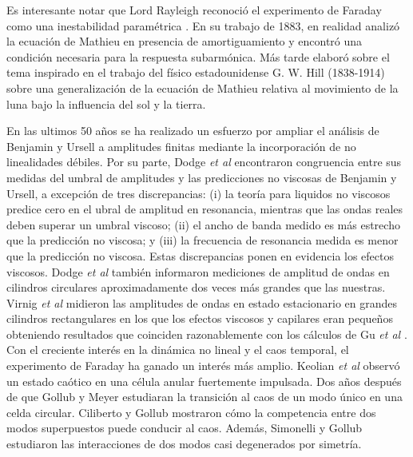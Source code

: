 Es interesante notar que Lord Rayleigh reconoció el experimento de Faraday como una inestabilidad paramétrica \cite{Rayleigh1883a}. En su trabajo de 1883, en realidad analizó la ecuación de Mathieu en presencia de amortiguamiento y encontró una condición necesaria para la respuesta subarmónica. Más tarde \cite{Rayleigh1887} elaboró sobre el tema inspirado en el trabajo del físico estadounidense G. W. Hill (1838-1914) \cite{Hill1886} sobre una generalización de la ecuación de Mathieu relativa al movimiento de la luna bajo la influencia del sol y la tierra.\medskip

En las ultimos 50 años se ha realizado un esfuerzo por ampliar el análisis de Benjamin y Ursell a amplitudes finitas mediante la incorporación de no linealidades débiles. Por su parte, Dodge \textit{et al} encontraron congruencia entre sus medidas del umbral de amplitudes \cite{Dodge1965} y las predicciones no viscosas de Benjamin y Ursell, a excepción de tres discrepancias: (i) la teoría para liquidos no viscosos predice cero en el ubral de amplitud en resonancia, mientras que las ondas reales deben superar un umbral viscoso; (ii) el ancho de banda medido es más estrecho que la predicción no viscosa; y (iii) la frecuencia de resonancia medida es menor que la predicción no viscosa. Estas discrepancias ponen en evidencia los efectos viscosos. Dodge \textit{et al} también informaron mediciones de amplitud de ondas en cilindros circulares aproximadamente dos veces más grandes que las nuestras. Virnig \textit{et al} midieron las amplitudes de ondas en estado estacionario en grandes cilindros rectangulares en los que los efectos viscosos y capilares eran pequeños \cite{Virnig1988} obteniendo resultados que coinciden razonablemente con los cálculos de Gu \textit{et al} \cite{Gu1988}. Con el creciente interés en la dinámica no lineal y el caos temporal, el experimento de Faraday ha ganado un interés más amplio. Keolian \textit{et al} \cite{Keolian1981} observó un estado caótico en una célula anular fuertemente impulsada. Dos años después de que Gollub y Meyer \cite{Gollub1983} estudiaran la transición al caos de un modo único en una celda circular. Ciliberto y Gollub \cite{Ciliberto1984, Ciliberto1985} mostraron cómo la competencia entre dos modos superpuestos puede conducir al caos. Además, Simonelli y Gollub \cite{Simonelli1989} estudiaron las interacciones de dos modos casi degenerados por simetría.

